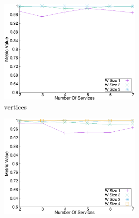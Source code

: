   \begin{figure}[H]
    \centering
    \begin{adjustbox}{minipage=\linewidth,scale=0.75}
      \begin{subfigure}{0.45\textwidth}
        \begin{subfigure}{\textwidth}
          \includegraphics[width=\textwidth]{Images/graphs/window_quality_performance_diff_qual_n7_s7_20_100_n3}
          \caption{ vertices}
          \label{fig:quality_window_wide_qualitative_n3}
        \end{subfigure}
        \begin{subfigure}{\textwidth}
          \includegraphics[width=\textwidth]{Images/graphs/window_quality_performance_diff_qual_n7_s7_20_100_n4}

\end{subfigure}
\end{subfigure}
\end{adjustbox}
\end{figure}

